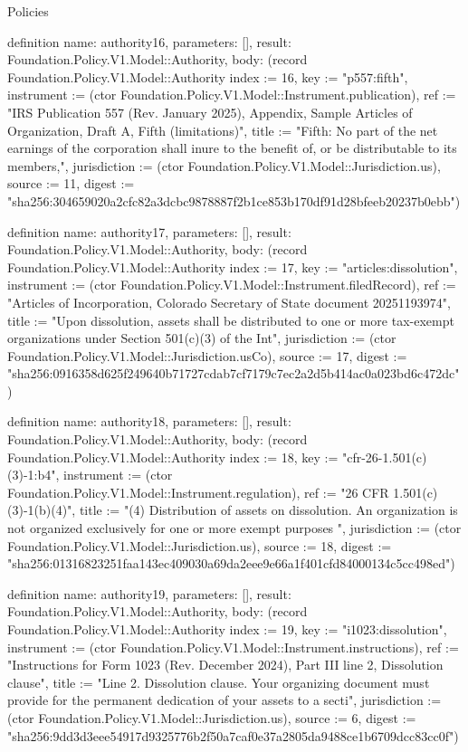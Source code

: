 \begin{lexlean}{Policies}
\begin{semanticmodule}
definition{
  name: authority16,
  parameters: [],
  result: Foundation.Policy.V1.Model::Authority,
  body: (record Foundation.Policy.V1.Model::Authority {index := 16, key := "p557:fifth", instrument := (ctor Foundation.Policy.V1.Model::Instrument.publication), ref := "IRS Publication 557 (Rev. January 2025), Appendix, Sample Articles of Organization, Draft A, Fifth (limitations)", title := "Fifth: No part of the net earnings of the corporation shall inure to the benefit of, or be distributable to its members,", jurisdiction := (ctor Foundation.Policy.V1.Model::Jurisdiction.us), source := 11, digest := "sha256:304659020a2cfc82a3dcbc9878887f2b1ce853b170df91d28bfeeb20237b0ebb"})
}

definition{
  name: authority17,
  parameters: [],
  result: Foundation.Policy.V1.Model::Authority,
  body: (record Foundation.Policy.V1.Model::Authority {index := 17, key := "articles:dissolution", instrument := (ctor Foundation.Policy.V1.Model::Instrument.filedRecord), ref := "Articles of Incorporation, Colorado Secretary of State document 20251193974", title := "Upon dissolution, assets shall be distributed to one or more tax-exempt organizations under Section 501(c)(3) of the Int", jurisdiction := (ctor Foundation.Policy.V1.Model::Jurisdiction.usCo), source := 17, digest := "sha256:0916358d625f249640b71727cdab7cf7179c7ec2a2d5b414ac0a023bd6c472dc"})
}

definition{
  name: authority18,
  parameters: [],
  result: Foundation.Policy.V1.Model::Authority,
  body: (record Foundation.Policy.V1.Model::Authority {index := 18, key := "cfr-26-1.501(c)(3)-1:b4", instrument := (ctor Foundation.Policy.V1.Model::Instrument.regulation), ref := "26 CFR 1.501(c)(3)-1(b)(4)", title := "(4) Distribution of assets on dissolution. An organization is not organized exclusively for one or more exempt purposes ", jurisdiction := (ctor Foundation.Policy.V1.Model::Jurisdiction.us), source := 18, digest := "sha256:01316823251faa143ec409030a69da2eee9e66a1f401cfd84000134c5cc498ed"})
}

definition{
  name: authority19,
  parameters: [],
  result: Foundation.Policy.V1.Model::Authority,
  body: (record Foundation.Policy.V1.Model::Authority {index := 19, key := "i1023:dissolution", instrument := (ctor Foundation.Policy.V1.Model::Instrument.instructions), ref := "Instructions for Form 1023 (Rev. December 2024), Part III line 2, Dissolution clause", title := "Line 2. Dissolution clause. Your organizing document must provide for the permanent dedication of your assets to a secti", jurisdiction := (ctor Foundation.Policy.V1.Model::Jurisdiction.us), source := 6, digest := "sha256:9dd3d3eee54917d9325776b2f50a7caf0e37a2805da9488ce1b6709dcc83cc0f"})
}


\end{semanticmodule}
\end{lexlean}
